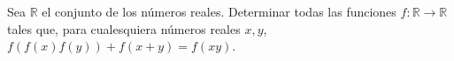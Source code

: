 Sea $\mathbb{R}$ el conjunto de los números reales. Determinar todas las funciones $f : \mathbb{R} \to \mathbb{R}$
tales que, para cualesquiera números reales $x, y$,
$f(f(x)f(y))+f(x+y)=f(xy)$.